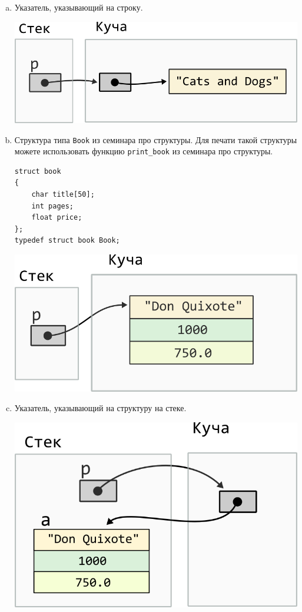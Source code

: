\documentclass[10pt]{article}
\newcommand{\mallocImagesScale}{0.72}
\begin{document}
\begin{enumerate}[a.]
\item Указатель, указывающий на строку.
\begin{center}
\includegraphics[scale=\mallocImagesScale]{../images/malloc_homework/02heap_pointer_char_array.png}
\end{center}


\item Структура типа \texttt{Book} из семинара про структуры. Для печати такой структуры можете использовать функцию \texttt{print\_book} из семинара про структуры.
\begin{lstlisting}
struct book 
{
    char title[50];
    int pages;
    float price;
};
typedef struct book Book;
\end{lstlisting}
\begin{center}
\includegraphics[scale=\mallocImagesScale]{../images/malloc_homework/03heap_struct_book.png}
\end{center}

\newpage
\item Указатель, указывающий на структуру на стеке.
\begin{center}
\includegraphics[scale=\mallocImagesScale]{../images/malloc_homework/04heap_pointer_stack_struct_book.png}
\end{center}



\end{enumerate}
\end{document}

